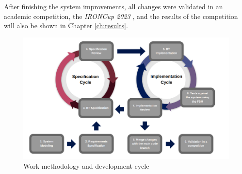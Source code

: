 After finishing the system improvements, all changes were validated in an academic competition, the \textit{IRONCup 2023} \cite{IRONCup2023}, and the results of the competition will also be shown in Chapter \ref{ch:results}.

\begin{figure}
    \centering
    \includegraphics[width=\linewidth]{chapters/methodology/images/Methodology.png}
    \caption{Work methodology and development cycle}
    \label{fig:methodology}
\end{figure}
